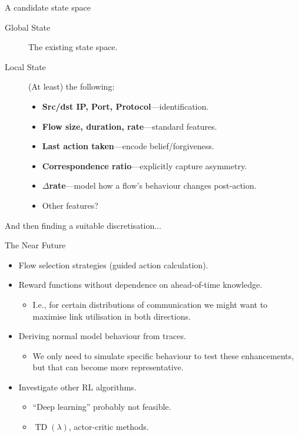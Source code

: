 \documentclass[aspectratio=169,xcolor={dvipsnames}
,hide notes
]{beamer}
\begin{document}
\begin{frame}{A candidate state space}
\begin{description}
	\item[Global State] The existing state space.
	\item[Local State] (At least) the following:
	\begin{itemize}
		\item \textbf{Src/dst IP, Port, Protocol}---identification.
		\item \textbf{Flow size, duration, rate}---standard features.
		\item \textbf{\alert{Last action taken}}---encode belief/forgiveness.
		\item \textbf{\alert{Correspondence ratio}}---explicitly capture asymmetry.
		\item \textbf{\alert{$\Delta$rate}}---model how a flow's behaviour changes post-action.
		\item Other features?
	\end{itemize}
\end{description}

And then finding a suitable discretisation...
\end{frame}

\begin{frame}{The Near Future}
\begin{itemize}
	\item Flow selection strategies (guided action calculation).
	\item Reward functions without dependence on ahead-of-time knowledge.
	\begin{itemize}
		\item I.e., for certain distributions of communication we might want to maximise link utilisation in both directions.
	\end{itemize}

\item Deriving normal model behaviour from traces.
\begin{itemize}
	\item We only need to simulate specific behaviour to test these enhancements, but that can become more representative.
\end{itemize}

\item Investigate other RL algorithms.
\begin{itemize}
	\item ``Deep learning'' probably not feasible.
	\item \alert{$\operatorname{TD}(\lambda)$, actor-critic methods}.
\end{itemize}
\end{itemize}
\end{frame}
\end{document}
